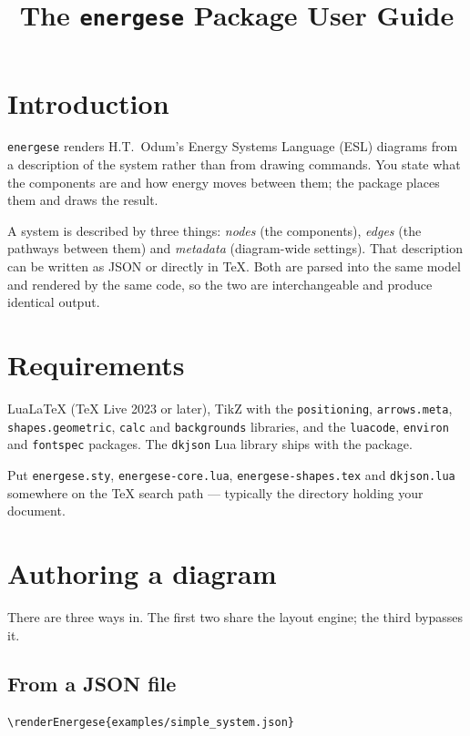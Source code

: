\documentclass{article}
\title{The \texttt{energese} Package User Guide}
\date{}
\begin{document}
\maketitle

\section{Introduction}

\texttt{energese} renders H.T.\ Odum's Energy Systems Language (ESL) diagrams
from a description of the system rather than from drawing commands. You state
what the components are and how energy moves between them; the package places
them and draws the result.

A system is described by three things: \emph{nodes} (the components), \emph{edges}
(the pathways between them) and \emph{metadata} (diagram-wide settings). That
description can be written as JSON or directly in \TeX. Both are parsed into the
same model and rendered by the same code, so the two are interchangeable and
produce identical output.

\section{Requirements}

Lua\LaTeX{} (\TeX{} Live 2023 or later), TikZ with the \texttt{positioning},
\texttt{arrows.meta}, \texttt{shapes.geometric}, \texttt{calc} and
\texttt{backgrounds} libraries, and the \texttt{luacode}, \texttt{environ} and
\texttt{fontspec} packages. The \texttt{dkjson} Lua library ships with the
package.

Put \texttt{energese.sty}, \texttt{energese-core.lua},
\texttt{energese-shapes.tex} and \texttt{dkjson.lua} somewhere on the \TeX{}
search path --- typically the directory holding your document.

\section{Authoring a diagram}

There are three ways in. The first two share the layout engine; the third
bypasses it.

\subsection{From a JSON file}

\begin{verbatim}
\renderEnergese{examples/simple_system.json}
\end{verbatim}
\end{document}
